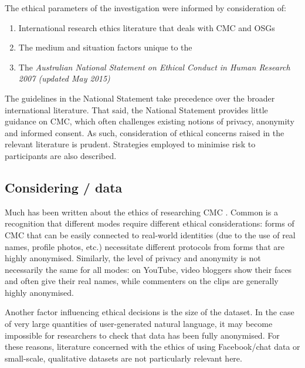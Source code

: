 

The ethical parameters of the investigation were informed by consideration of:

\begin{enumerate}
    \item International research ethics literature that deals with \gls{CMC} and \glspl{OSG}
    \item The medium and situation factors unique to the 
    \item The \emph{Australian National Statement on Ethical Conduct in Human Research 2007 (updated May 2015)} \nocite{national_health_and_medical_research_council_the_australian_research_council_and_the_australian_vice-chancellors_committee_national_2015}
\end{enumerate}
%
The guidelines in the National Statement take precedence over the broader international literature. That said, the National Statement provides little guidance on \gls{CMC}, which often challenges existing notions of privacy, anonymity and informed consent. As such, consideration of ethical concerns raised in the relevant literature is prudent. Strategies employed to minimise risk to participants are also described.

\subsection{Considering \slash {} data}

Much has been written about the ethics of researching \gls{CMC} \cite{boyd_social_2007-1,ess_internet_2007,eysenbach_towards_2000,hewson_ethics_2015,landert_private_2011,stevens_public_2015,walther_research_2002}. Common is a recognition that different \glspl{mode} require different ethical considerations: forms of \gls{CMC} that can be easily connected to real\hyp{}world identities (due to the use of real names, profile photos, etc.) necessitate different protocols from forms that are highly anonymised. Similarly, the level of privacy and anonymity is not necessarily the same for all \glspl{mode}: on YouTube, video bloggers show their faces and often give their real names, while commenters on the clips are generally highly anonymised.

Another factor influencing ethical decisions is the size of the dataset. In the case of very large quantities of user\hyp{}generated natural language, it may become impossible for researchers to check that data has been fully anonymised. For these reasons, literature concerned with the ethics of using Facebook\slash chat data \cite[e.g.][]{hudson_``go_2004,zimmer_but_2010} or small\hyp{}scale, qualitative datasets \cite[e.g.][]{eysenbach_ethical_2001,roberts_ethical_2015} are not particularly relevant here.

